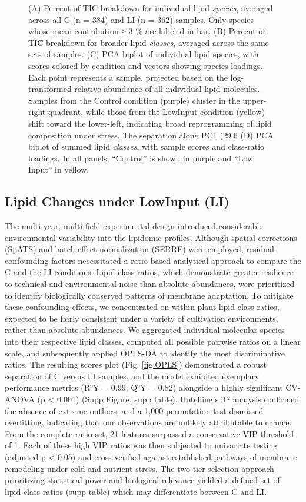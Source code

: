 \documentclass[10pt,letterpaper]{article}
\begin{document}
\begin{figure}[htp]
  \caption{%
    (A) Percent‐of‐TIC breakdown for individual lipid \emph{species}, averaged across all C (n = 384) and LI (n = 362) samples. Only species whose mean contribution ≥ 3 \% are labeled in‐bar.  
    (B) Percent‐of‐TIC breakdown for broader lipid \emph{classes}, averaged across the same sets of samples.  
    (C) PCA biplot of individual lipid species, with scores colored by condition and vectors showing species loadings. Each point represents a sample, projected based on the log-transformed relative abundance of all individual lipid molecules. Samples from the Control condition (purple) cluster in the upper-right quadrant, while those from the LowInput condition (yellow) shift toward the lower-left, indicating broad reprogramming of lipid composition under stress. The separation along PC1 (29.6%
    (D) PCA biplot of summed lipid \emph{classes}, with sample scores and class‐ratio loadings.  
    In all panels, “Control” is shown in purple and “Low Input” in yellow.}
  \label{fig:lipid_main}
\end{figure}



\subsection*{Lipid Changes under LowInput (LI)}
The multi-year, multi-field experimental design introduced considerable environmental variability into the lipidomic profiles. Although spatial corrections (SpATS) and batch-effect normalization (SERRF) were employed, residual confounding factors necessitated a ratio-based analytical approach to compare the C and the LI conditions. Lipid class ratios, which demonstrate greater resilience to technical and environmental noise than absolute abundances, were prioritized to identify biologically conserved patterns of membrane adaptation. To mitigate these confounding effects, we concentrated on within-plant lipid class ratios, expected to be fairly consistent under a variety of cultivation environments, rather than absolute abundances. We aggregated individual molecular species into their respective lipid classes, computed all possible pairwise ratios on a linear scale, and subsequently applied OPLS-DA to identify the most discriminative ratios. The resulting scores plot (Fig. \ref{fig:OPLS}) demonstrated a robust separation of C versus LI samples, and the model exhibited exemplary performance metrics (R²Y = 0.99; Q²Y = 0.82) alongside a highly significant CV-ANOVA (p < 0.001) (Supp Figure, supp table). Hotelling’s T² analysis confirmed the absence of extreme outliers, and a 1,000-permutation test dismissed overfitting, indicating that our observations are unlikely attributable to chance. From the complete ratio set, 21 features surpassed a conservative VIP threshold of 1. Each of these high VIP ratios was then subjected to univariate testing (adjusted p < 0.05) and cross-verified against established pathways of membrane remodeling under cold and nutrient stress. The two-tier selection approach prioritizing statistical power and biological relevance yielded a defined set of lipid-class ratios (supp table) which may differentiate between C and LI.
\end{document}
